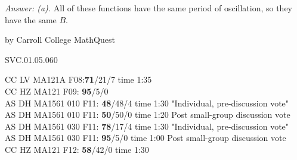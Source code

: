 {\it Answer: (a).} All of these functions have the same period of oscillation, so they have the same $B$.

\medskip

by Carroll College MathQuest

SVC.01.05.060

CC LV MA121A F08:{\bf71}/21/7 time 1:35\\
CC HZ MA121 F09: {\bf 95}/5/0  \\
AS DH MA1561 010 F11: {\bf 48}/48/4 time 1:30 "Individual, pre-discussion vote" \\
AS DH MA1561 010 F11: {\bf 50}/50/0 time 1:20 Post small-group discussion vote \\
AS DH MA1561 030 F11: {\bf 78}/17/4 time 1:30 "Individual, pre-discussion vote" \\
AS DH MA1561 030 F11: {\bf 95}/5/0 time 1:00 Post small-group discussion vote \\
CC HZ MA121 F12: {\bf 58}/42/0 time 1:30  \\
